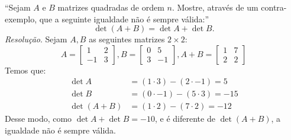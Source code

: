 \enquote{Sejam $A$ e $B$ matrizes quadradas de ordem $n$. Mostre, através de um contra-exemplo, que a seguinte igualdade não é sempre válida:}
\begin{displaymath}
    \det(A + B) = \det A + \det B.
\end{displaymath}
\emph{Resolução}. Sejam $A, B$ as seguintes matrizes $2\times2$:
\begin{displaymath}
    A = \left[\begin{array}{cc} 
        1 & 2 \\ 
        -1 & 3 
        \end{array}\right], 
    B = \left[\begin{array}{cc} 
        0 & 5 \\
        3 & -1 
        \end{array}\right], 
    A + B = \left[\begin{array}{cc} 
        1 & 7 \\ 
        2 & 2 
        \end{array}\right]
\end{displaymath}
Temos que:
\begin{align*}
    \det A &= (1 \cdot 3) - (2 \cdot -1) = 5 \\
    \det B &= (0 \cdot -1) - (5 \cdot 3) = -15 \\
    \det (A+B) &= (1 \cdot 2) - (7 \cdot 2) = -12
\end{align*}
Desse modo, como $\det A + \det B = -10$, e é diferente de $\det (A + B)$, a igualdade não é sempre válida.